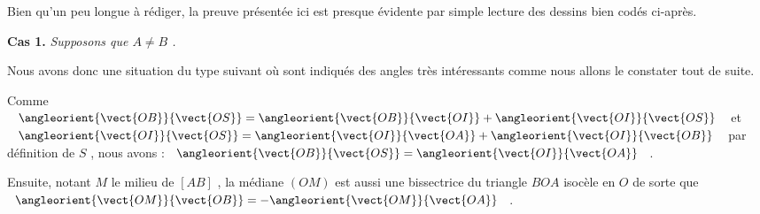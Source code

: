 Bien qu'un peu longue à rédiger, la preuve présentée ici est presque évidente par simple lecture des dessins bien codés ci-après.


\bigskip


\textbf{Cas 1.} \emph{Supposons que $A \neq B$ .}

\medskip

Nous avons donc une situation du type suivant où sont indiqués des angles très intéressants comme nous allons le constater tout de suite.

\smallskip
\begin{center}
\end{center}
\smallskip

Comme 
$\angleorient{\vect{OB}}{\vect{OS}}
= \angleorient{\vect{OB}}{\vect{OI}}
+ \angleorient{\vect{OI}}{\vect{OS}}$
et
$\angleorient{\vect{OI}}{\vect{OS}}
= \angleorient{\vect{OI}}{\vect{OA}}
+ \angleorient{\vect{OI}}{\vect{OB}}$ 
par définition de $S$ , nous avons :
$\angleorient{\vect{OB}}{\vect{OS}}
= \angleorient{\vect{OI}}{\vect{OA}}$
.


\smallskip

Ensuite, notant $M$ le milieu de $[AB]$ , la médiane $(OM)$ est aussi une bissectrice du triangle $BOA$ isocèle en $O$ de sorte que
$\angleorient{\vect{OM}}{\vect{OB}} 
= - \angleorient{\vect{OM}}{\vect{OA}}$ 
.


